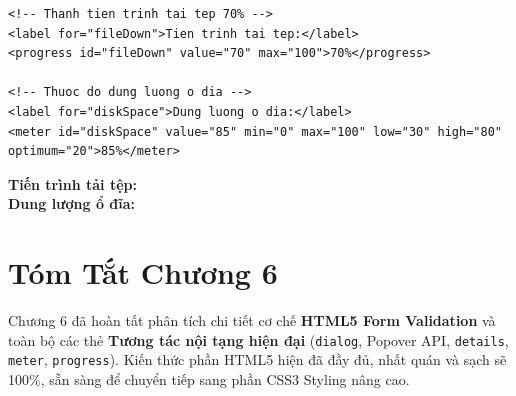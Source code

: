 \documentclass[11pt,oneside]{book}
\newcommand{\thd}[1]{\textcolor{white}{\textbf{\strut #1}}}
\newcommand{\codeinline}[1]{\textcolor{accentOrange}{\texttt{#1}}}
\begin{document}
\begin{prettyTableBox}
\end{prettyTableBox}

\begin{codeWindow}
\begin{lstlisting}[language=HTML5]
<!-- Thanh tien trinh tai tep 70% -->
<label for="fileDown">Tien trinh tai tep:</label>
<progress id="fileDown" value="70" max="100">70%</progress>

<!-- Thuoc do dung luong o dia -->
<label for="diskSpace">Dung luong o dia:</label>
<meter id="diskSpace" value="85" min="0" max="100" low="30" high="80" optimum="20">85%</meter>
\end{lstlisting}
\end{codeWindow}

\begin{browserWindow}
\sffamily\small
\textbf{Tiến trình tải tệp:} \;\;
 \\[6pt]
\textbf{Dung lượng ổ đĩa:} \;\;
\end{browserWindow}

\section{Tóm Tắt Chương 6}
Chương 6 đã hoàn tất phân tích chi tiết cơ chế \textbf{HTML5 Form Validation} và toàn bộ các thẻ \textbf{Tương tác nội tạng hiện đại} (\codeinline{dialog}, Popover API, \codeinline{details}, \codeinline{meter}, \codeinline{progress}). Kiến thức phần HTML5 hiện đã đầy đủ, nhất quán và sạch sẽ 100\%, sẵn sàng để chuyển tiếp sang phần CSS3 Styling nâng cao.
\end{document}
